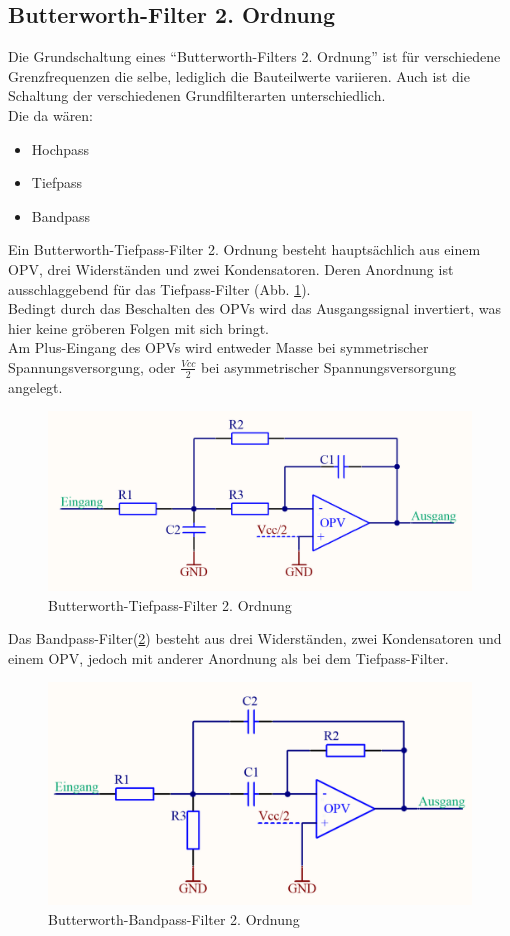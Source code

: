 \subsection{Butterworth-Filter 2. Ordnung}\label{subsec:3.3.2}
Die Grundschaltung eines \enquote{Butterworth-Filters 2. Ordnung} ist für verschiedene Grenzfrequenzen die selbe, lediglich die Bauteilwerte variieren. Auch ist die Schaltung der verschiedenen Grundfilterarten unterschiedlich. \\
Die da wären: 
\begin{itemize}
	\item Hochpass
	\item Tiefpass
	\item Bandpass
\end{itemize}
Ein Butterworth-Tiefpass-Filter 2. Ordnung besteht hauptsächlich aus einem OPV, drei Widerständen und zwei Kondensatoren. Deren Anordnung ist ausschlaggebend für das Tiefpass-Filter (Abb. \ref{fig:3.3.2.1}).\\ 
Bedingt durch das Beschalten des OPVs wird das Ausgangssignal invertiert, was hier keine gröberen Folgen mit sich bringt.\\ 
Am Plus-Eingang des OPVs wird entweder Masse bei symmetrischer Spannungsversorgung, oder $\frac{Vcc}{2}$ bei asymmetrischer Spannungsversorgung angelegt.
\begin{figure} [H]
	\centering
	\includegraphics[width=1\textwidth]{img/Print3/TPFilterButterworth2Ordnung.PNG}
	\caption{Butterworth-Tiefpass-Filter 2. Ordnung}
	\label {fig:3.3.2.1}
\end{figure}
Das Bandpass-Filter(\ref{fig:3.3.2.2}) besteht aus drei Widerständen, zwei Kondensatoren und einem OPV, jedoch mit anderer Anordnung als bei dem Tiefpass-Filter.
\begin{figure} [H]
	\centering
	\includegraphics[width=1\textwidth]{img/Print4/BPFilter-Butterworth2Ordnung.PNG}
	\caption{Butterworth-Bandpass-Filter 2. Ordnung}
	\label {fig:3.3.2.2}
\end{figure}
